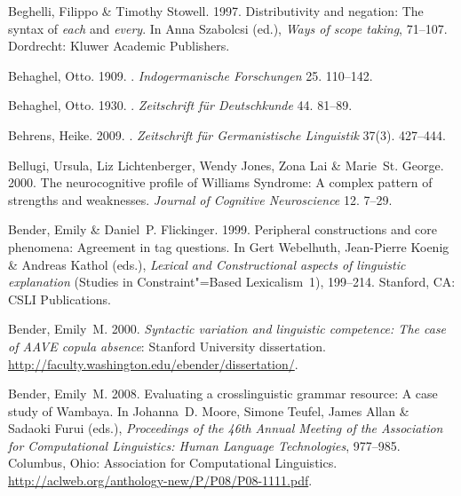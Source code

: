 \begin{thebibliography}{1420}
Beghelli, Filippo \& Timothy Stowell. 1997.
\newblock Distributivity and negation: {The} syntax of \emph{each} and
  \emph{every}.
\newblock In Anna Szabolcsi (ed.), \emph{Ways of scope taking}, 71--107.
  Dordrecht: Kluwer Academic Publishers.

Behaghel, Otto. 1909.
.
\newblock \emph{Indogermanische Forschungen} 25. 110--142.

Behaghel, Otto. 1930.
.
\newblock \emph{Zeitschrift f{\"u}r Deutschkunde} 44. 81--89.

Behrens, Heike. 2009.
.
\newblock \emph{Zeitschrift f{\"u}r Germanistische Linguistik} 37(3). 427--444.

Bellugi, Ursula, Liz Lichtenberger, Wendy Jones, Zona Lai \& Marie~St. George.
  2000.
\newblock The neurocognitive profile of {Williams Syndrome}: {A} complex
  pattern of strengths and weaknesses.
\newblock \emph{Journal of Cognitive Neuroscience} 12. 7--29.

Bender, Emily \& Daniel~P. Flickinger. 1999.
\newblock Peripheral constructions and core phenomena: {Agreement} in tag
  questions.
\newblock In Gert Webelhuth, Jean-Pierre Koenig \& Andreas Kathol (eds.),
  \emph{Lexical and {Constructional} aspects of linguistic explanation}
  (Studies in Constraint"=Based Lexicalism~1), 199--214. Stanford, CA: CSLI
  Publications.

Bender, Emily~M. 2000.
\newblock \emph{Syntactic variation and linguistic competence: {The} case of
  {AAVE} copula absence}: Stanford University dissertation.
\newblock \urlprefix\url{http://faculty.washington.edu/ebender/dissertation/}.

Bender, Emily~M. 2008{}.
\newblock Evaluating a crosslinguistic grammar resource: {A} case study of
  {Wambaya}.
\newblock In Johanna~D. Moore, Simone Teufel, James Allan \& Sadaoki Furui
  (eds.), \emph{Proceedings of the {46th Annual Meeting of the Association for
  Computational Linguistics: Human Language Technologies}}, 977--985. Columbus,
  Ohio: Association for Computational Linguistics.
\newblock \urlprefix\url{http://aclweb.org/anthology-new/P/P08/P08-1111.pdf}.


\end{thebibliography}
